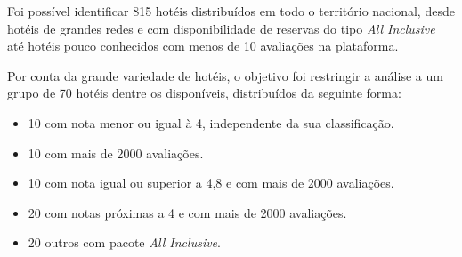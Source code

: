 Foi possível identificar 815 hotéis distribuídos em todo o território nacional, desde hotéis de grandes redes e com disponibilidade de reservas do tipo \emph{All Inclusive} até hotéis pouco conhecidos com menos de 10 avaliações na plataforma.








Por conta da grande variedade de hotéis, o objetivo foi restringir a análise a um grupo de 70 hotéis dentre os disponíveis, distribuídos da seguinte forma:

\begin{itemize}
  \item 10 com nota menor ou igual à 4, independente da sua classificação.
  \item 10 com mais de 2000 avaliações.
  \item 10 com nota igual ou superior a 4,8 e com mais de 2000 avaliações.
  \item 20 com notas próximas a 4 e com mais de 2000 avaliações.
  \item 20 outros com pacote \emph{All Inclusive}.
\end{itemize}


